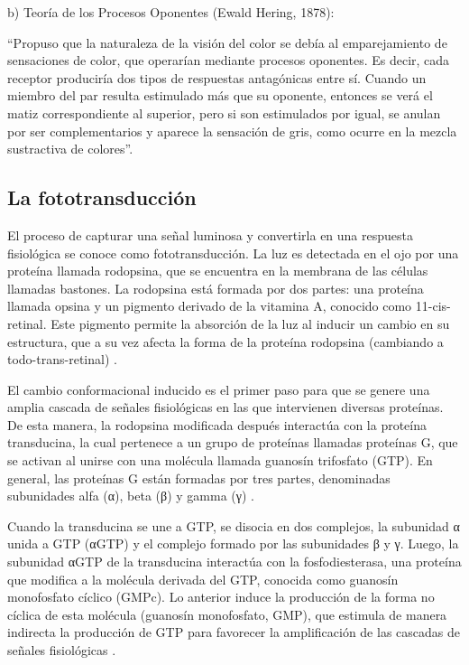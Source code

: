 \documentclass[10pt]{article}
\begin{document}
b) Teoría de los Procesos Oponentes (Ewald Hering, 1878):
 
“Propuso que la naturaleza de la visión del color se debía al emparejamiento de sensaciones de color, que operarían mediante procesos oponentes. Es decir, cada receptor produciría dos tipos de respuestas antagónicas entre sí. Cuando un miembro del par resulta estimulado más que su oponente, entonces se verá el matiz correspondiente al superior, pero si son estimulados por igual, se anulan por ser complementarios y aparece la sensación de gris, como ocurre en la mezcla sustractiva de colores”\cite{IEEEreferencias:Ref14}.

\subsection{La fototransducción}

El proceso de capturar una señal luminosa y convertirla en una respuesta fisiológica se conoce como fototransducción. La luz es detectada en el ojo por una proteína llamada rodopsina, que se encuentra en la membrana de las células llamadas bastones. La rodopsina está formada por dos partes: una proteína llamada opsina y un pigmento derivado de la vitamina A, conocido como 11-cis-retinal. Este pigmento permite la absorción de la luz al inducir un cambio en su estructura, que a su vez afecta la forma de la proteína rodopsina (cambiando a todo-trans-retinal) \cite{IEEEreferencias:Ref12}.

\setlength{\parskip}{2mm}

El cambio conformacional inducido es el primer paso para que se genere una amplia cascada de señales fisiológicas en las que intervienen diversas proteínas. De esta manera, la rodopsina modificada después interactúa con la proteína transducina, la cual pertenece a un grupo de proteínas llamadas proteínas G, que se activan al unirse con una molécula llamada guanosín trifosfato (GTP). En general, las proteínas G están formadas por tres partes, denominadas subunidades alfa (α), beta (β) y gamma (γ) \cite{IEEEreferencias:Ref12}. 

\setlength{\parskip}{2mm}

Cuando la transducina se une a GTP, se disocia en dos complejos, la subunidad α unida a GTP
(αGTP) y el complejo formado por las subunidades β y γ. Luego, la subunidad αGTP de la transducina interactúa con la fosfodiesterasa, una proteína que modifica a la molécula derivada del GTP, conocida como guanosín monofosfato cíclico (GMPc). Lo anterior induce la producción de la forma no cíclica de esta molécula (guanosín monofosfato, GMP), que estimula de manera indirecta la producción de GTP para favorecer la amplificación de las cascadas de señales fisiológicas \cite{IEEEreferencias:Ref12}.
\end{document}
